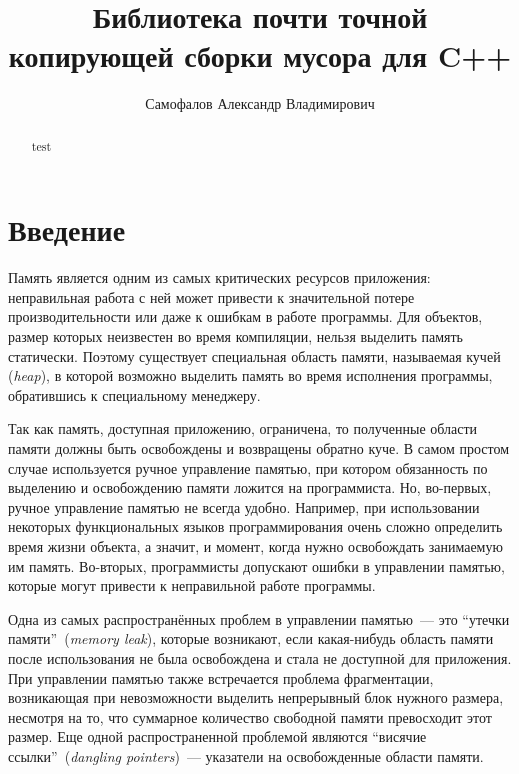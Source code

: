 \title{Библиотека почти точной копирующей сборки мусора для C++}


\author{Самофалов Александр Владимирович}



\maketitle             

\begin{abstract}
test
\end{abstract}

\section*{Введение}
Память является одним из самых критических ресурсов приложения: неправильная работа с ней
может привести к значительной потере производительности или даже к ошибкам в
работе программы. Для объектов, размер которых неизвестен во время компиляции, нельзя выделить память статически. Поэтому существует специальная область памяти, называемая кучей (\textit{heap}),
в которой возможно выделить память во время исполнения программы, обратившись к специальному менеджеру.

Так как память, доступная приложению, ограничена, то полученные области памяти должны быть освобождены и возвращены обратно куче. В самом простом случае используется ручное управление памятью, при котором обязанность по выделению и освобождению памяти ложится на программиста. Но, во-первых, ручное управление памятью не всегда удобно.
Например, при использовании некоторых функциональных языков программирования очень сложно
определить время жизни объекта, а значит, и момент, когда нужно освобождать занимаемую им память. Во-вторых, программисты допускают ошибки в управлении памятью,
которые могут привести к неправильной работе программы. 

Одна из самых распространённых проблем в управлении памятью~--- это ``утечки памяти''~(\textit{memory leak}), 
которые возникают, если какая-нибудь область памяти после использования не была
освобождена и стала не доступной для приложения. При управлении памятью также встречается проблема фрагментации, возникающая при невозможности выделить непрерывный блок нужного размера,
несмотря на то, что суммарное количество свободной памяти превосходит этот размер. 
Еще одной распространенной проблемой являются ``висячие ссылки''~(\textit{dangling pointers})~--- указатели на освобожденные области памяти.

